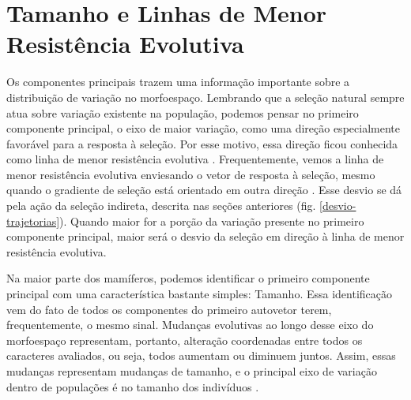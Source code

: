 \documentclass[portuges,]{tufte-handout}
\begin{document}
\section{Tamanho e Linhas de Menor Resistência
Evolutiva}\label{tamanho-e-linhas-de-menor-resistuxeancia-evolutiva}

Os componentes principais trazem uma informação importante sobre a
distribuição de variação no morfoespaço. Lembrando que a seleção natural
sempre atua sobre variação existente na população, podemos pensar no
primeiro componente principal, o eixo de maior variação, como uma
direção especialmente favorável para a resposta à seleção. Por esse
motivo, essa direção ficou conhecida como linha de menor resistência
evolutiva \cite{Schluter1996}. Frequentemente, vemos a linha de
menor resistência evolutiva enviesando o vetor de resposta à seleção,
mesmo quando o gradiente de seleção está orientado em outra direção
\cite{Marroig2005}. Esse desvio se dá pela ação da seleção indireta,
descrita nas seções anteriores (fig. \ref{desvio-trajetorias}). Quando
maior for a porção da variação presente no primeiro componente
principal, maior será o desvio da seleção em direção à linha de menor
resistência evolutiva.

Na maior parte dos mamíferos, podemos identificar o primeiro componente
principal com uma característica bastante simples: Tamanho. Essa
identificação vem do fato de todos os componentes do primeiro autovetor
terem, frequentemente, o mesmo sinal. Mudanças evolutivas ao longo desse
eixo do morfoespaço representam, portanto, alteração coordenadas entre
todos os caracteres avaliados, ou seja, todos aumentam ou diminuem
juntos. Assim, essas mudanças representam mudanças de tamanho, e o
principal eixo de variação dentro de populações é no tamanho dos
indivíduos \cite{Porto2009}.



\end{document}
